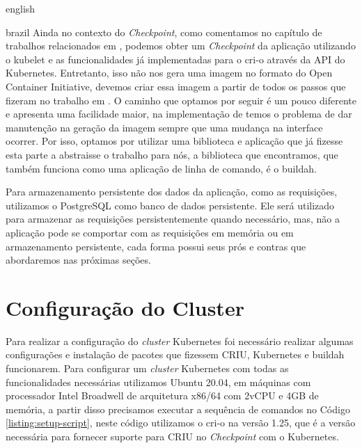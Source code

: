 \begin{otherlanguage*}{english}
\begin{otherlanguage*}{brazil}
Ainda no contexto do \textit{Checkpoint}, como comentamos no capítulo de trabalhos
relacionados em \cite{schmidttransparent}, podemos obter um \textit{Checkpoint} da
aplicação utilizando o kubelet e as funcionalidades já implementadas para o cri-o
através da API do Kubernetes. Entretanto, isso não nos gera uma imagem no formato
do Open Container Initiative, devemos criar essa imagem a partir de todos os
passos que fizeram no trabalho em \cite{schmidttransparent}. O caminho que optamos
por seguir é um pouco diferente e apresenta uma facilidade maior, na implementação
de \cite{schmidttransparent} temos o problema de dar manutenção na geração da imagem
sempre que uma mudança na interface ocorrer. Por isso, optamos por utilizar uma
biblioteca e aplicação que já fizesse esta parte a abstraisse o trabalho para nós, a
biblioteca que encontramos, que também funciona como uma aplicação de linha de comando,
é o buildah\cite{buildah}.

Para armazenamento persistente dos dados da aplicação, como as requisições, utilizamos
o PostgreSQL \cite{postgresql} como banco de dados persistente. Ele será utilizado para
armazenar as requisições persistentemente quando necessário, mas, não a aplicação pode
se comportar com as requisições em memória ou em armazenamento persistente, cada forma
possui seus prós e contras que abordaremos nas próximas seções.

\section{Configuração do Cluster}

Para realizar a configuração do \textit{cluster} Kubernetes foi necessário realizar
algumas configurações e instalação de pacotes que fizessem CRIU, Kubernetes e buildah
funcionarem. Para configurar um \textit{cluster} Kubernetes com todas as funcionalidades
necessárias utilizamos Ubuntu 20.04, em máquinas com processador Intel Broadwell de
arquitetura x86/64 com 2vCPU e 4GB de memória, a partir disso precisamos executar a
sequência de comandos no Código \ref{listing:setup-script}, neste código utilizamos
o cri-o na versão 1.25, que é a versão necessária para fornecer suporte para CRIU no
\textit{Checkpoint} com o Kubernetes.


\end{otherlanguage*}
\end{otherlanguage*}
